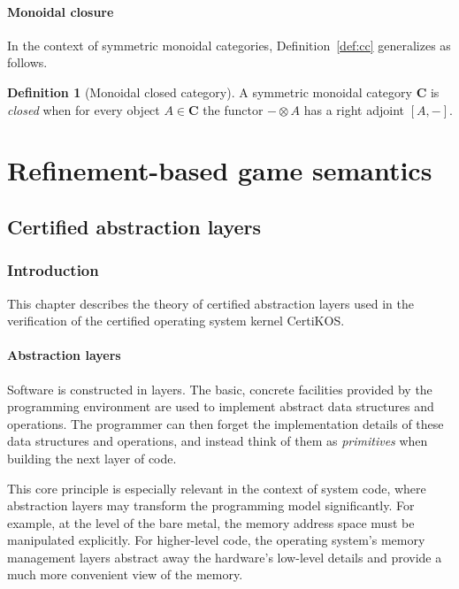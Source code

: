 \documentclass[11pt,oneside]{book}
\theoremstyle{definition}
\newtheorem{definition}[theorem]{Definition}
\begin{document}
\subsection{Monoidal closure}

In the context of symmetric monoidal categories,
Definition~\ref{def:cc} generalizes as follows.

\begin{definition}[Monoidal closed category]
A symmetric monoidal category $\mathbf{C}$ is \emph{closed}
when for every object $A \in \mathbf{C}$
the functor ${-} \otimes A$
has a right adjoint $[A, {-}]$.
\end{definition}




\part{Refinement-based game semantics} \label{part:rbgs}

\chapter{Certified abstraction layers} \label{sec:cal} %

\section{Introduction} %

This chapter describes
the theory of certified abstraction layers
used in the verification of
the certified operating system kernel CertiKOS.

\subsection{Abstraction layers} %

Software is constructed in layers.
The basic, concrete facilities provided by the programming environment
are used to implement abstract data structures and operations.
The programmer can then forget the implementation details
of these data structures and operations,
and instead think of them as \emph{primitives}
when building the next layer of code.

This core principle is especially relevant
in the context of system code,
where abstraction layers
may transform the programming model significantly.
For example,
at the level of the bare metal,
the memory address space must be manipulated explicitly.
For higher-level code,
the operating system's memory management layers
abstract away the hardware's low-level details and
provide a much more convenient view of the memory.
\end{document}
